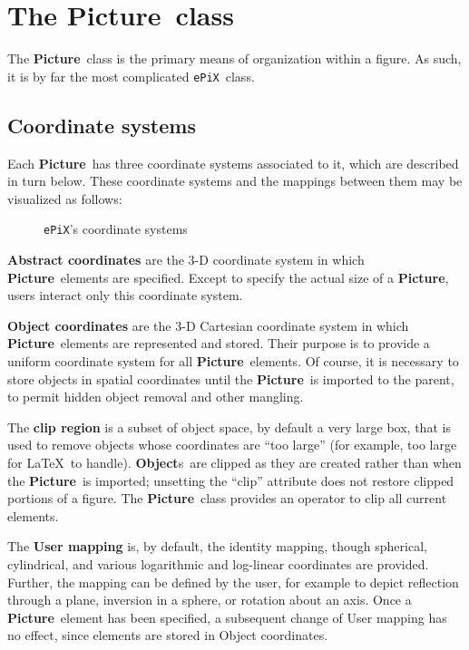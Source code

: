 \documentclass[12pt]{article}
\newcommand{\Class}[1]{\textbf{#1}}
\newcommand{\Program}[1]{\texttt{#1}}
\newcommand{\Objects}{\Class{Object}s}
\newcommand{\Picture}{\Class{Picture}}
\newcommand{\ePiX}{\Program{ePiX}}
\begin{document}
\section{The \Picture\ class}

The \Picture\ class is the primary means of organization within a
figure. As such, it is by far the most complicated \ePiX\ class.

\subsection{Coordinate systems}

Each \Picture\ has three coordinate systems associated to it, which
are described in turn below. These coordinate systems and the mappings
between them may be visualized as follows:

\begin{figure}[hbt]
\begin{center}

\caption{\ePiX's coordinate systems}
\label{fig:coordinates}
\end{center}
\end{figure}


\medskip

\noindent\textbf{Abstract coordinates} are the 3-D coordinate system
in which \Picture\ elements are specified. Except to specify the
actual size of a \Picture, users interact only this coordinate system.


\medskip

\noindent\textbf{Object coordinates} are the 3-D Cartesian coordinate
system in which \Picture\ elements are represented and stored. Their
purpose is to provide a uniform coordinate system for all \Picture\ 
elements. Of course, it is necessary to store objects in spatial
coordinates until the \Picture\ is imported to the parent, to permit
hidden object removal and other mangling.

The \textbf{clip region} is a subset of object space, by default a
very large box, that is used to remove objects whose coordinates are
``too large'' (for example, too large for \LaTeX\ to handle).
\Objects\ are clipped as they are created rather than when the
\Picture\ is imported; unsetting the ``clip'' attribute does not
restore clipped portions of a figure. The \Picture\ class provides an
operator to clip all current elements.

The \textbf{User mapping} is, by default, the identity mapping, though
spherical, cylindrical, and various logarithmic and log-linear
coordinates are provided. Further, the mapping can be defined by the
user, for example to depict reflection through a plane, inversion in a
sphere, or rotation about an axis. Once a \Picture\ element has been
specified, a subsequent change of User mapping has no effect, since
elements are stored in Object coordinates.
\end{document}
